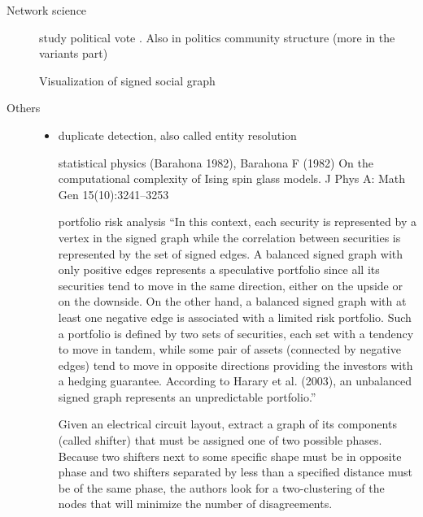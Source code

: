 \begin{description}
     \item[Network science]
study political vote \autocites{BrazilCC17}{Jiang2015}{Mendonca2015}. Also in politics
community structure \autocites{Traag2009}{CommunityUN12} (more in the variants part)

Visualization of signed social graph \autocite{Luca10}


\item[Others]
   \begin{itemize}
	\item duplicate detection, also called entity resolution \autocite{DeDup09}

statistical physics (Barahona 1982), Barahona F (1982) On the computational complexity of Ising
	   spin glass models. J Phys A: Math Gen 15(10):3241–3253 \autocite{Ising82}

portfolio risk analysis
	   \enquote{In this context, each security is represented by a vertex in the signed graph
	      while the correlation between securities is represented by the set of signed edges. A
	      balanced signed graph with only positive edges represents a speculative portfolio
	      since all its securities tend to move in the same direction, either on the upside or
	      on the downside. On the other hand, a balanced signed graph with at least one negative
	      edge is associated with a limited risk portfolio. Such a portfolio is defined by two
	      sets of securities, each set with a tendency to move in tandem, while some pair of
	      assets (connected by negative edges) tend to move in opposite directions providing the
	      investors with a hedging guarantee. According to Harary et al. (2003), an unbalanced
	   signed graph represents an unpredictable portfolio.}\autocite{portfolio02}

Given an electrical circuit layout, \textcite{circuitDesign07} extract a graph of its components
(called shifter) that must be assigned one of two possible phases. Because two shifters next to some
specific shape must be in opposite phase and two shifters separated by less than a specified
distance must be of the same phase, the authors look for a two-clustering of the nodes that will
minimize the number of disagreements.
   \end{itemize}
\end{description}

